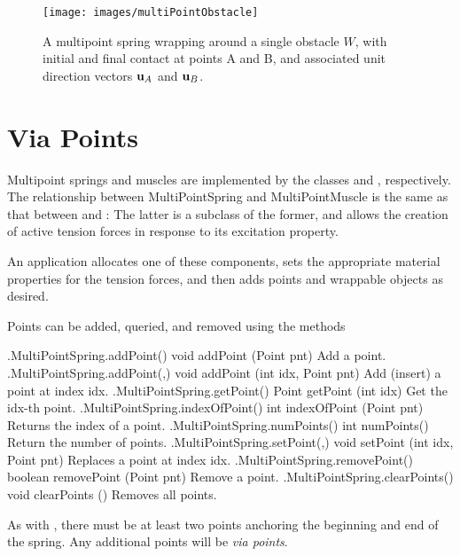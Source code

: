 \begin{figure}[ht]
\begin{center}
 \texttt{[image: images/multiPointObstacle]}
\end{center}
\caption{A multipoint spring wrapping around a single obstacle $W$,
with initial and final contact at points A and B, 
and associated unit direction vectors ${\bf u}_A$ and ${\bf u}_B$.}
\label{multiPointObstacle:fig}
\end{figure}

\section{Via Points}
\label{ViaPoints:sec}

Multipoint springs and muscles are implemented by the classes
 and
, respectively.
The relationship between {MultiPointSpring} and 
{MultiPointMuscle} is the same as that between
 and :
The latter is a subclass of the former, and allows
the creation of active tension forces in response to
its {\sf excitation} property.

An application allocates one of these components, sets the appropriate
material properties for the tension forces, and then adds points and
wrappable objects as desired.

Points can be added, queried, and removed using the methods
%
%
\begin{methodtable}{0.5}{0.5}
\midline
%
\methodentry
{\mech.MultiPointSpring.addPoint()}%
{void addPoint (Point pnt)}%
{Add a point.}%
%
\methodentry
{\mech.MultiPointSpring.addPoint(,)}%
{void addPoint (int idx, Point pnt)}%
{Add (insert) a point at index idx.}%
%
\methodentry
{\mech.MultiPointSpring.getPoint()}%
{Point getPoint (int idx)}%
{Get the idx-th point.}%
%
\methodentry
{\mech.MultiPointSpring.indexOfPoint()}%
{int indexOfPoint (Point pnt)}%
{Returns the index of a point.}%
%
\methodentry
{\mech.MultiPointSpring.numPoints()}%
{int numPoints()}%
{Return the number of points.}%
%
\methodentry
{\mech.MultiPointSpring.setPoint(,)}%
{void setPoint (int idx, Point pnt)}%
{Replaces a point at index idx.}%
%
\methodentry
{\mech.MultiPointSpring.removePoint()}%
{boolean removePoint (Point pnt)}%
{Remove a point.}%
%
\methodentry
{\mech.MultiPointSpring.clearPoints()}%
{void clearPoints ()}%
{Removes all points.}%
%
\midline
\end{methodtable}
%
As with , there must
be at least two points anchoring the beginning and end of the
spring. Any additional points will be {\it via points}.

